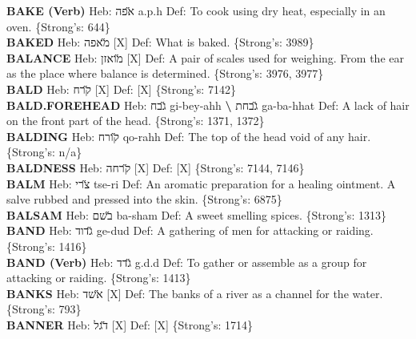 {\textbf{BAKE (Verb)} Heb: {\large\H אפה} a.p.h Def: To cook using dry heat, especially in an oven. \{Strong's: 644\}\hfill{}\\

\textbf{BAKED} Heb: {\large\H מאפה} {[}X{]} Def: What is baked. \{Strong's: 3989\}\hfill{}\\

\textbf{BALANCE} Heb: {\large\H מואזן} {[}X{]} Def: A pair of scales used for weighing. From the ear as the place where balance is determined. \{Strong's: 3976, 3977\}\hfill{}\\

\textbf{BALD} Heb: {\large\H קרח} {[}X{]} Def: {[}X{]} \{Strong's: 7142\}\hfill{}\\

\textbf{BALD.FOREHEAD} Heb: {\large\H גבח} gi-bey-ahh \textbf{\textbackslash{}} {\large\H גבחת} ga-ba-hhat Def: A lack of hair on the front part of the head. \{Strong's: 1371, 1372\}\hfill{}\\

\textbf{BALDING} Heb: {\large\H קורח} qo-rahh Def: The top of the head void of any hair. \{Strong's: n/a\}\hfill{}\\

\textbf{BALDNESS} Heb: {\large\H קרחה} {[}X{]} Def: {[}X{]} \{Strong's: 7144, 7146\}\hfill{}\\

\textbf{BALM} Heb: {\large\H צרי} tse-ri Def: An aromatic preparation for a healing ointment. A salve rubbed and pressed into the skin. \{Strong's: 6875\}\hfill{}\\

\textbf{BALSAM} Heb: {\large\H בשם} ba-sham Def: A sweet smelling spices. \{Strong's: 1313\}\hfill{}\\

\textbf{BAND} Heb: {\large\H גדוד} ge-dud Def: A gathering of men for attacking or raiding. \{Strong's: 1416\}\hfill{}\\

\textbf{BAND (Verb)} Heb: {\large\H גדד} g.d.d Def: To gather or assemble as a group for attacking or raiding. \{Strong's: 1413\}\hfill{}\\

\textbf{BANKS} Heb: {\large\H אשד} {[}X{]} Def: The banks of a river as a channel for the water. \{Strong's: 793\}\hfill{}\\

\textbf{BANNER} Heb: {\large\H דגל} {[}X{]} Def: {[}X{]} \{Strong's: 1714\}\hfill{}\\

}
